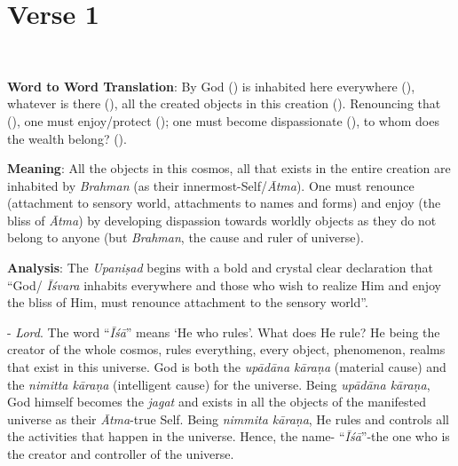 \chapter{Verse 1}

\begin{moolashloka}
\\
\end{moolashloka}

\textbf{Word to Word Translation}: By God () is inhabited here everywhere (), whatever is there (), all the created objects in this creation (). Renouncing that (), one must enjoy/protect (); one must become dispassionate (), to whom does the wealth belong? ().

\textbf{Meaning}: All the objects in this cosmos, all that exists in the entire creation are inhabited by \emph{Brahman} (as their innermost-Self/\emph{Ātma}). One must renounce (attachment to sensory world, attachments to names and forms) and enjoy (the bliss of \emph{Ātma}) by developing dispassion towards worldly objects as they do not belong to anyone (but \emph{Brahman}, the cause and ruler of universe).

\textbf{Analysis}: The \emph{Upaniṣad} begins with a bold and crystal clear declaration that ``God/ \emph{Īśvara} inhabits everywhere and those who wish to realize Him and enjoy the bliss of Him, must renounce attachment to the sensory world''.

- \emph{Lord}. The word ``\emph{Īśā}'' means `He who rules'. What does He rule? He being the creator of the whole cosmos, rules everything, every object, phenomenon, realms that exist in this universe. God is both the \emph{upādāna kāraṇa} (material cause) and the \emph{nimitta kāraṇa} (intelligent cause) for the universe. Being \emph{upādāna kāraṇa}, God himself becomes the \emph{jagat} and exists in all the objects of the manifested universe as their \emph{Ātma}-true Self. Being \emph{nimmita kāraṇa}, He rules and controls all the activities that happen in the universe. Hence, the name- ``\emph{Īśā}''-the one who is the creator and controller of the universe.

